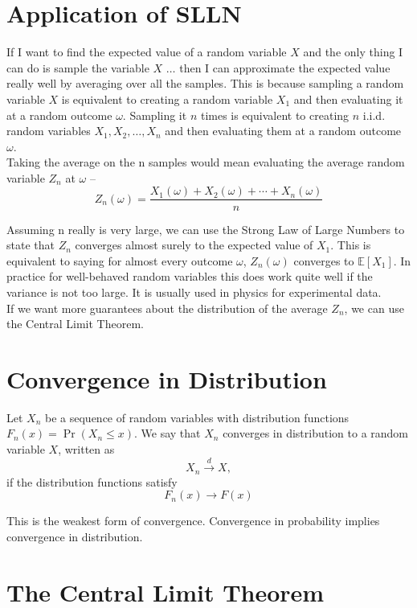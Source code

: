\section*{Application of SLLN}


If I want to find the expected value of a random variable $X$ and the only thing 
I can do is sample the variable $X$ $\dots$ then I can approximate the expected value really well 
by averaging over all the samples. This is because sampling a random variable $X$ is equivalent to 
creating a random variable $X_1$ and then evaluating it at a random outcome $\omega$. 
Sampling it $n$ times is equivalent to creating $n$ i.i.d. random variables $X_1,X_2,\ldots,X_n$ and 
then evaluating them at a random outcome $\omega$.\\


\noindent Taking the average on the n samples would mean evaluating the average random variable $Z_n$ at $\omega$ --
\[
Z_n(\omega)=\frac{X_1(\omega)+X_2(\omega)+\cdots+X_n(\omega)}{n}
\]

Assuming n really is very large, we can use the Strong Law of Large Numbers to state that $Z_n$
converges almost surely to the expected value of $X_1$. This is equivalent to saying for almost every 
outcome $\omega$, $Z_n(\omega)$ converges to $\mathbb E[X_1]$. In practice for well-behaved 
random variables this does work quite well if the variance is not too large. It is usually used in 
physics for experimental data.\\


\noindent If we want more guarantees about the distribution of the average $Z_n$, we can use the 
Central Limit Theorem.

\section{Convergence in Distribution}

Let \(X_n\) be a sequence of random variables with 
distribution functions \(F_n(x)=\Pr(X_n\le x)\). We say that \(X_n\) converges 
in distribution to a random variable \(X\), written as
\[
X_n \xrightarrow{d} X,
\]
if the distribution functions satisfy
\[
F_n(x)\to F(x)
\]

This is the weakest form of convergence. Convergence in probability implies convergence in distribution.

\section{The Central Limit Theorem}

